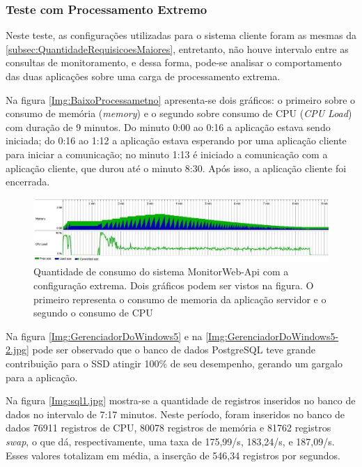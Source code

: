 \subsubsection{Teste com Processamento Extremo}\label{subsec:APIQuantidadeRequisicoesMaior}


Neste teste, as configurações utilizadas para o sistema cliente foram as mesmas da \autoref{subsec:QuantidadeRequisicoesMaiores}, entretanto, não houve intervalo entre as consultas de monitoramento, e dessa forma, pode-se analisar o comportamento das duas aplicações sobre uma carga de processamento extrema.

Na figura \autoref{Img:BaixoProcessametno} apresenta-se dois gráficos: o primeiro sobre o consumo de memória (\textit{memory}) e o segundo sobre consumo de CPU (\textit{CPU Load}) com duração de 9 minutos. Do minuto 0:00 ao 0:16 a aplicação estava sendo iniciada; do 0:16 ao 1:12 a aplicação estava esperando por uma aplicação cliente para iniciar a comunicação; no minuto 1:13 é iniciado a comunicação com a aplicação cliente, que durou até o minuto 8:30. Após isso, a aplicação cliente foi encerrada.

\begin{figure}[H]
	\centering
	\includegraphics[width=1.0\textwidth]{figuras/MonitorWebApiTeste4/AutoProcessametno.jpg}
	\caption[Quantidade de consumo com a configuração extrema]{Quantidade de consumo do sistema MonitorWeb-Api com a configuração extrema. Dois gráficos podem ser vistos na figura. O primeiro representa o consumo de memoria da aplicação servidor e o segundo o consumo de CPU}
	\label{Img:AutoProcessametno.jpg}
\end{figure}

Na figura \autoref{Img:GerenciadorDoWindows5} e na \autoref{Img:GerenciadorDoWindows5-2.jpg} pode ser observado que o banco de dados PostgreSQL teve grande contribuição para o SSD atingir 100\% de seu desempenho, gerando um gargalo para a aplicação. 

Na figura \autoref{Img:sql1.jpg} mostra-se a quantidade de registros inseridos no banco de dados no intervalo de 7:17 minutos. Neste período, foram inseridos no banco de dados 76911 registros de CPU, 80078 registros de memória e 81762 registros \textit{swap}, o que dá, respectivamente, uma taxa de 175,99/s, 183,24/s, e 187,09/s. Esses valores totalizam em média, a inserção de 546,34 registros por segundos.

